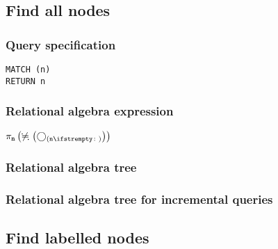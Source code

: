 \subsection{Find all nodes}

\subsubsection*{Query specification}

\begin{lstlisting}
MATCH (n)
RETURN n
\end{lstlisting}

\subsubsection*{Relational algebra expression}

$\projection{\var{n}} \left(\alldifferent{} \left(\getvertices{n}{}\right)\right)$

\subsubsection*{Relational algebra tree}


\subsubsection*{Relational algebra tree for incremental queries}


\subsection{Find labelled nodes}

